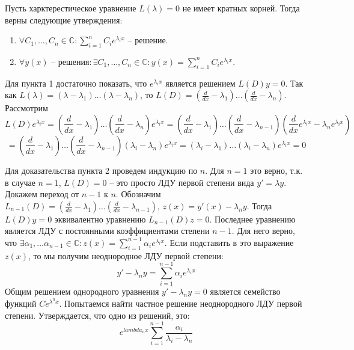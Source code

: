 \documentclass[document.tex]{subfiles}
\begin{document}
\begin{Theorem}
Пусть харктерестическое уравнение $L(\lambda) = 0$ не имеет кратных корней. Тогда верны следующие утверждения:
\begin{enumerate}
\item $\forall C_1, \ldots, C_n \in \mathbb{C}: \displaystyle \sum_{i = 1}^n C_i e^{\lambda_i x}$ -- решение.
\item $\forall y(x) \text{ -- решения} : \exists C_1, \ldots, C_n \in \mathbb{C}: y(x) = \displaystyle \sum_{i = 1}^n C_i e^{\lambda_i x}$.
\end{enumerate}
\end{Theorem}

\begin{Proof}
Для пункта 1 достаточно показать, что $e^{\lambda_i x}$ является решением $L(D)y = 0$. Так как $L(\lambda) = (\lambda - \lambda_1)\ldots(\lambda - \lambda_n)$, то $L(D) = (\frac{d}{dx} - \lambda_1)\ldots(\frac{d}{dx} - \lambda_n)$. Рассмотрим 
$$L(D)e^{\lambda_i x} = (\frac{d}{dx} - \lambda_1)\ldots(\frac{d}{dx} - \lambda_n) e^{\lambda_i x} = (\frac{d}{dx} - \lambda_1)\ldots(\frac{d}{dx} - \lambda_{n-1})(\frac{d}{dx}e^{\lambda_i x} - \lambda_n e^{\lambda_i x})$$
$$ = (\frac{d}{dx} - \lambda_1)\ldots(\frac{d}{dx} - \lambda_{n-1})(\lambda_i - \lambda_n)e^{\lambda_i x} = (\lambda_i - \lambda_1)\ldots(\lambda_i - \lambda_n)e^{\lambda_i x} = 0$$

Для доказательства пункта 2 проведем индукцию по $n$. Для $n = 1$ это верно, т.к. в случае $n = 1$, $L(D) = 0$ -- это просто ЛДУ первой степени вида $y' = \lambda y$. Докажем переход от $n - 1$ к $n$. Обозначим $L_{n-1}(D) = (\frac{d}{dx} - \lambda_1)\ldots(\frac{d}{dx} - \lambda_{n-1})$, $z(x) = y'(x) - \lambda_n y$. Тогда $L(D)y = 0$ эквивалентно уравнению $L_{n-1}(D)z = 0$. Последнее уравнению является ЛДУ с постоянными коэффициентами степени $n-1$. Для него верно, что $\exists \alpha_1, \ldots \alpha_{n-1} \in \mathbb{C}: z(x) = \displaystyle \sum_{i = 1}^{n-1} \alpha_i e^{\lambda_i x}$. Если подставить в это выражение $z(x)$, то мы получим неоднородное ЛДУ первой степени:
$$y' - \lambda_n y = \sum_{i = 1}^{n-1} \alpha_i e^{\lambda_i x}$$
Общим решением однородного уравнения $y' - \lambda_n y = 0$ является семейство функций $Ce^{\lambda^n x}$. Попытаемся найти частное решение неоднородного ЛДУ первой степени. Утверждается, что одно из решений, это:
$$e^{lambda_n x} \sum_{i = 1}^{n - 1} \frac{\alpha_i}{\lambda_i - \lambda_n}$$

\end{Proof}
\end{document}
